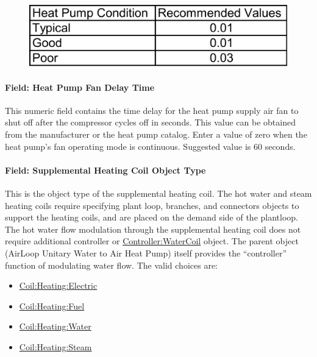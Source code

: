 \begin{figure}[htbp]
\centering
\includegraphics{media/image307.png}
\caption{}
\end{figure}

\paragraph{Field: Heat Pump Fan Delay Time}\label{field-heat-pump-fan-delay-time-1}

This numeric field contains the time delay for the heat pump supply air fan to shut off after the compressor cycles off in seconds. This value can be obtained from the manufacturer or the heat pump catalog. Enter a value of zero when the heat pump's fan operating mode is continuous. Suggested value is 60 seconds.

\paragraph{Field: Supplemental Heating Coil Object Type}\label{field-supplemental-heating-coil-object-type-3}

This is the object type of the supplemental heating coil. The hot water and steam heating coils require specifying plant loop, branches, and connectors objects to support the heating coils, and are placed on the demand side of the plantloop. The hot water flow modulation through the supplemental heating coil does not require additional controller or \hyperref[controllerwatercoil]{Controller:WaterCoil} object. The parent object (AirLoop Unitary Water to Air Heat Pump) itself provides the ``controller'' function of modulating water flow. The valid choices are:

\begin{itemize}
\item
  \hyperref[coilheatingelectric]{Coil:Heating:Electric}
\item
  \hyperref[coilheatinggas-000]{Coil:Heating:Fuel}
\item
  \hyperref[coilheatingwater]{Coil:Heating:Water}
\item
  \hyperref[coilheatingsteam]{Coil:Heating:Steam}
\end{itemize}

